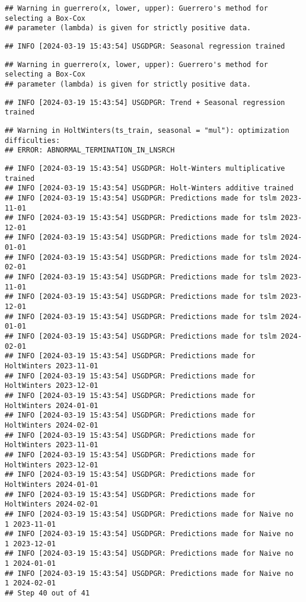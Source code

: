 \documentclass[
]{article}
\begin{document}
\begin{verbatim}
## Warning in guerrero(x, lower, upper): Guerrero's method for selecting a Box-Cox
## parameter (lambda) is given for strictly positive data.
\end{verbatim}

\begin{verbatim}
## INFO [2024-03-19 15:43:54] USGDPGR: Seasonal regression trained
\end{verbatim}

\begin{verbatim}
## Warning in guerrero(x, lower, upper): Guerrero's method for selecting a Box-Cox
## parameter (lambda) is given for strictly positive data.
\end{verbatim}

\begin{verbatim}
## INFO [2024-03-19 15:43:54] USGDPGR: Trend + Seasonal regression trained
\end{verbatim}

\begin{verbatim}
## Warning in HoltWinters(ts_train, seasonal = "mul"): optimization difficulties:
## ERROR: ABNORMAL_TERMINATION_IN_LNSRCH
\end{verbatim}

\begin{verbatim}
## INFO [2024-03-19 15:43:54] USGDPGR: Holt-Winters multiplicative trained
## INFO [2024-03-19 15:43:54] USGDPGR: Holt-Winters additive trained
## INFO [2024-03-19 15:43:54] USGDPGR: Predictions made for tslm 2023-11-01
## INFO [2024-03-19 15:43:54] USGDPGR: Predictions made for tslm 2023-12-01
## INFO [2024-03-19 15:43:54] USGDPGR: Predictions made for tslm 2024-01-01
## INFO [2024-03-19 15:43:54] USGDPGR: Predictions made for tslm 2024-02-01
## INFO [2024-03-19 15:43:54] USGDPGR: Predictions made for tslm 2023-11-01
## INFO [2024-03-19 15:43:54] USGDPGR: Predictions made for tslm 2023-12-01
## INFO [2024-03-19 15:43:54] USGDPGR: Predictions made for tslm 2024-01-01
## INFO [2024-03-19 15:43:54] USGDPGR: Predictions made for tslm 2024-02-01
## INFO [2024-03-19 15:43:54] USGDPGR: Predictions made for HoltWinters 2023-11-01
## INFO [2024-03-19 15:43:54] USGDPGR: Predictions made for HoltWinters 2023-12-01
## INFO [2024-03-19 15:43:54] USGDPGR: Predictions made for HoltWinters 2024-01-01
## INFO [2024-03-19 15:43:54] USGDPGR: Predictions made for HoltWinters 2024-02-01
## INFO [2024-03-19 15:43:54] USGDPGR: Predictions made for HoltWinters 2023-11-01
## INFO [2024-03-19 15:43:54] USGDPGR: Predictions made for HoltWinters 2023-12-01
## INFO [2024-03-19 15:43:54] USGDPGR: Predictions made for HoltWinters 2024-01-01
## INFO [2024-03-19 15:43:54] USGDPGR: Predictions made for HoltWinters 2024-02-01
## INFO [2024-03-19 15:43:54] USGDPGR: Predictions made for Naive no  1 2023-11-01
## INFO [2024-03-19 15:43:54] USGDPGR: Predictions made for Naive no  1 2023-12-01
## INFO [2024-03-19 15:43:54] USGDPGR: Predictions made for Naive no  1 2024-01-01
## INFO [2024-03-19 15:43:54] USGDPGR: Predictions made for Naive no  1 2024-02-01
## Step 40 out of 41
\end{verbatim}
\end{document}
